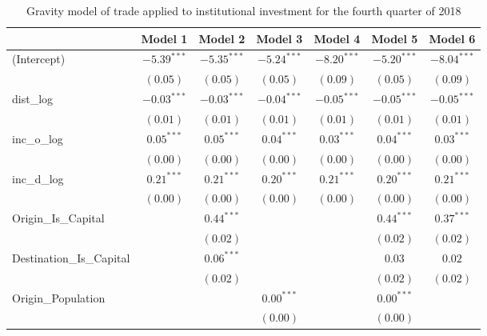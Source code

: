 \begin{table}
	\begin{center}
		\small
		\caption[CGravity Model of Trade for Q4 2018]{Gravity model of trade applied to institutional investment for the fourth quarter of 2018}
		\begin{tabular}{l c c c c c c }
		\hline
		& Model 1 & Model 2 & Model 3 & Model 4 & Model 5 & Model 6 \\
		\hline
		(Intercept)                  & $-5.39^{***}$ & $-5.35^{***}$ & $-5.24^{***}$ & $-8.20^{***}$ & $-5.20^{***}$ & $-8.04^{***}$ \\
		& $(0.05)$      & $(0.05)$      & $(0.05)$      & $(0.09)$      & $(0.05)$      & $(0.09)$      \\
		dist\_log                    & $-0.03^{***}$ & $-0.03^{***}$ & $-0.04^{***}$ & $-0.05^{***}$ & $-0.05^{***}$ & $-0.05^{***}$ \\
		& $(0.01)$      & $(0.01)$      & $(0.01)$      & $(0.01)$      & $(0.01)$      & $(0.01)$      \\
		inc\_o\_log                  & $0.05^{***}$  & $0.05^{***}$  & $0.04^{***}$  & $0.03^{***}$  & $0.04^{***}$  & $0.03^{***}$  \\
		& $(0.00)$      & $(0.00)$      & $(0.00)$      & $(0.00)$      & $(0.00)$      & $(0.00)$      \\
		inc\_d\_log                  & $0.21^{***}$  & $0.21^{***}$  & $0.20^{***}$  & $0.21^{***}$  & $0.20^{***}$  & $0.21^{***}$  \\
		& $(0.00)$      & $(0.00)$      & $(0.00)$      & $(0.00)$      & $(0.00)$      & $(0.00)$      \\
		Origin\_Is\_Capital          &               & $0.44^{***}$  &               &               & $0.44^{***}$  & $0.37^{***}$  \\
		&               & $(0.02)$      &               &               & $(0.02)$      & $(0.02)$      \\
		Destination\_Is\_Capital     &               & $0.06^{***}$  &               &               & $0.03$        & $0.02$        \\
		&               & $(0.02)$      &               &               & $(0.02)$      & $(0.02)$      \\
		Origin\_Population           &               &               & $0.00^{***}$  &               & $0.00^{***}$  &               \\
		&               &               & $(0.00)$      &               & $(0.00)$      &               \\

\end{tabular}
\end{center}
\end{table}
